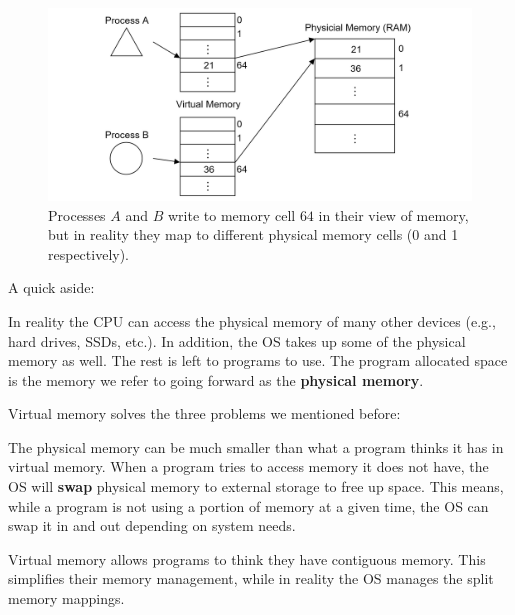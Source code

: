 \begin{figure}[h]
    \centering
    \includegraphics[width=\textwidth]{Sections/virt/virt.png}
    
    \vspace{1em}
    \caption{Processes $A$ and $B$ write to memory cell $64$ in their view of memory, but in reality they map 
    to different physical memory cells (0 and 1 respectively).}
    
    \label{fig:virt2}
\end{figure}

\noindent
A quick aside:

\begin{theo}

    In reality the CPU can access the physical memory of many other devices (e.g., hard drives, SSDs, etc.). In 
    addition, the OS takes up some of the physical memory as well. The rest is left to programs to use. The 
    program allocated space is the memory we refer to going forward as the \textbf{physical memory}.
\end{theo}

\noindent
Virtual memory solves the three problems we mentioned before:
\begin{Def}

    The physical memory can be much smaller than what a program thinks it has in virtual memory. When a program tries to access memory 
    it does not have, the OS will \textbf{swap} physical memory to external storage to free up space. This means, while a program is not using 
    a portion of memory at a given time, the OS can swap it in and out depending on system needs.
\end{Def}

\newpage
\begin{Def}

    Virtual memory allows programs to think they have contiguous memory. This simplifies their 
    memory management, while in reality the OS manages the split memory mappings.
\end{Def}